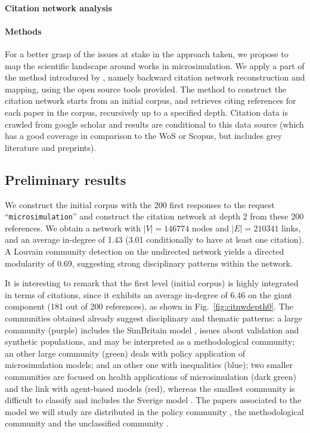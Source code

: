 \documentclass[11pt]{article}
\begin{document}
\paragraph{Citation network analysis}


\paragraph{Methods}

For a better grasp of the issues at stake in the approach taken, we propose to map the scientific landscape around works in microsimulation. We apply a part of the method introduced by \cite{raimbault2017exploration}, namely backward citation network reconstruction and mapping, using the open source tools provided. The method to construct the citation network starts from an initial corpus, and retrieves citing references for each paper in the corpus, recursively up to a specified depth. Citation data is crawled from google scholar and results are conditional to this data source (which has a good coverage in comparison to the WoS or Scopus, but includes grey literature and preprints).




\subsection{Preliminary results}

We construct the initial corpus with the 200 first responses to the request ``\texttt{microsimulation}'' and construct the citation network at depth 2 from these 200 references. We obtain a network with $\left|V\right|=146774$ nodes and $\left|E\right|=210341$ links, and an average in-degree of 1.43 (3.01 conditionally to have at least one citation). A Louvain community detection on the undirected network yields a directed modularity of 0.69, suggesting strong disciplinary patterns within the network.  

It is interesting to remark that the first level (initial corpus) is highly integrated in terms of citations, since it exhibits an average in-degree of 6.46 on the giant component (181 out of 200 references), as shown in Fig.~\ref{fig:citnwdepth0}. The communities obtained already suggest disciplinary and thematic patterns: a large community (purple) includes the SimBritain model \cite{ballas2005simbritain}, issues about validation and synthetic populations, and may be interpreted as a methodological community; an other large community (green) deals with policy application of microsimulation models; and an other one with inequalities (blue); two smaller communities are focused on health applications of microsimulation (dark green) and the link with agent-based models (red), whereas the smallest community is difficult to classify and includes the Sverige model \cite{holm2002sverige}. The papers associated to the model we will study are distributed in the policy community \cite{wu2012moses}, the methodological community \cite{townend2009moses} and the unclassified community \cite{rees2017moses}.
\end{document}
